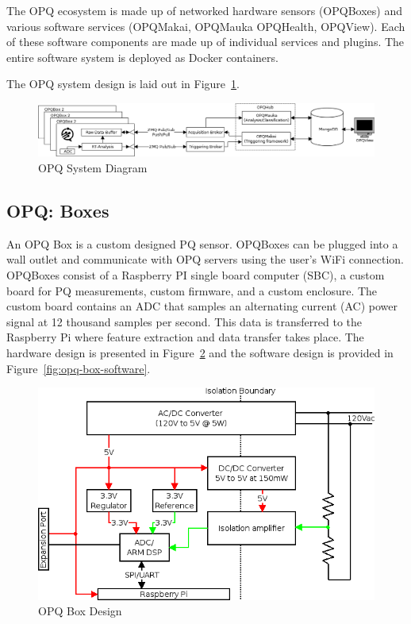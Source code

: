 The OPQ ecosystem is made up of networked hardware sensors (OPQBoxes) and various software services (OPQMakai, OPQMauka OPQHealth, OPQView). Each of these software components are made up of individual services and plugins. The entire software system is deployed as Docker containers.

The OPQ system design is laid out in Figure~\ref{fig:opq-system}.

\begin{figure}
	\centering
	\includegraphics[width=\linewidth]{figures/system-diagram.png}
	\caption{OPQ System Diagram}\label{fig:opq-system}
\end{figure}


\subsection{OPQ: Boxes}\label{subsec:opq:-boxes}
An OPQ Box is a custom designed PQ sensor. OPQBoxes can be plugged into a wall outlet and communicate with OPQ servers using the user's WiFi connection. OPQBoxes consist of a Raspberry PI single board computer (SBC), a custom board for PQ measurements, custom firmware, and a custom enclosure. The custom board contains an ADC that samples an alternating current (AC) power signal at 12 thousand samples per second. This data is transferred to the Raspberry Pi where feature extraction and data transfer takes place. The hardware design is presented in Figure~\ref{fig:opq-box-design} and the software design is provided in Figure~\ref{fig:opq-box-software}.

\begin{figure}
	\centering
	\includegraphics[width=.75\linewidth]{figures/opqbox_diagram.png}
	\caption{OPQ Box Design}\label{fig:opq-box-design}
\end{figure}

